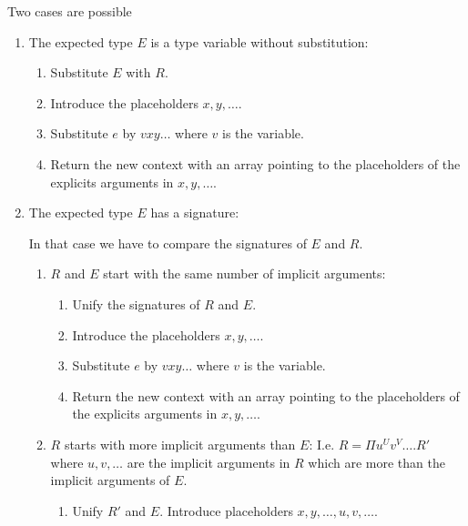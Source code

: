 Two cases are possible
\begin{enumerate}

\item The expected type $E$ is a type variable without substitution:

  \begin{enumerate}
  \item Substitute $E$ with $R$.

  \item Introduce the placeholders $x, y, \ldots$.

  \item Substitute $e$ by $v x y \ldots$ where $v$ is the variable.

  \item Return the new context with an array pointing to the placeholders of
    the explicits arguments in $x, y, \ldots$.
  \end{enumerate}

\item The expected type $E$ has a signature:

  In that case we have to compare the signatures of $E$ and $R$.

  \begin{enumerate}
  \item $R$ and $E$ start with the same number of implicit arguments:

    \begin{enumerate}
    \item  Unify the signatures of $R$ and $E$.

    \item Introduce the placeholders $x, y, \ldots$.

    \item Substitute $e$ by $v x y \ldots$ where $v$ is the variable.

    \item Return the new context with an array pointing to the placeholders of
      the explicits arguments in $x, y, \ldots$.
    \end{enumerate}


  \item $R$ starts with more implicit arguments than $E$: I.e. $R = \Pi u^U v^V
    \ldots . R'$ where $u, v, \ldots$ are the implicit arguments in $R$ which
    are more than the implicit arguments of $E$.

    \begin{enumerate}
    \item  Unify $R'$ and $E$. Introduce placeholders $x, y, \ldots, u, v, \ldots$.


\end{enumerate}
\end{enumerate}
\end{enumerate}
